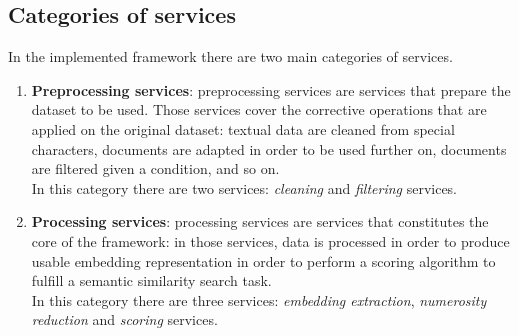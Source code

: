 \documentclass[\main/main.tex]{subfiles}
\begin{document}
\subsection{Categories of services}
In the implemented framework there are two main categories of services.
\begin{enumerate}
    \item \textbf{Preprocessing services}: preprocessing services are services that prepare the dataset to be used. Those services cover the corrective operations that are applied on the original dataset: textual data are cleaned from special characters, documents are adapted in order to be used further on, documents are filtered given a condition, and so on.  \\
    In this category there are two services: \emph{cleaning} and \emph{filtering} services.
    \item \textbf{Processing services}: processing services are services that constitutes the core of the framework: in those services, data is processed in order to produce usable embedding representation in order to perform a scoring algorithm to fulfill a semantic similarity search task. \\
    In this category there are three services: \emph{embedding extraction}, \emph{numerosity reduction} and \emph{scoring} services.
\end{enumerate}
\newpage
\end{document}
